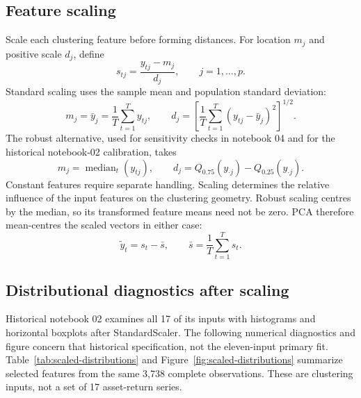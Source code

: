 \documentclass[11pt,a4paper]{article}
\begin{document}
\subsection{Feature scaling}

Scale each clustering feature before forming distances. For location $m_j$ and positive scale $d_j$, define
\begin{equation}
s_{tj}=\frac{y_{tj}-m_j}{d_j},
\qquad j=1,\ldots,p.
\label{eq:scaling}
\end{equation}
Standard scaling uses the sample mean and population standard deviation:
\begin{equation}
m_j=\bar y_j=\frac1T\sum_{t=1}^{T}y_{tj},
\qquad
d_j=\left[\frac1T\sum_{t=1}^{T}(y_{tj}-\bar y_j)^2\right]^{1/2}.
\end{equation}
The robust alternative, used for sensitivity checks in notebook 04 and for the historical notebook-02 calibration, takes
\begin{equation}
m_j=\operatorname{median}_t(y_{tj}),
\qquad
d_j=Q_{0.75}(y_{\cdot j})-Q_{0.25}(y_{\cdot j}).
\end{equation}
Constant features require separate handling. Scaling determines the relative influence of the input features on the clustering geometry. Robust scaling centres by the median, so its transformed feature means need not be zero. PCA therefore mean-centres the scaled vectors in either case:
\begin{equation}
\widetilde y_t=s_t-\bar s,
\qquad \bar s=\frac1T\sum_{t=1}^{T}s_t.
\end{equation}

\subsection{Distributional diagnostics after scaling}

Historical notebook 02 examines all 17 of its inputs with histograms and horizontal boxplots after StandardScaler. The following numerical diagnostics and figure concern that historical specification, not the eleven-input primary fit. Table~\ref{tab:scaled-distributions} and Figure~\ref{fig:scaled-distributions} summarize selected features from the same 3,738 complete observations. These are clustering inputs, not a set of 17 asset-return series.
\end{document}
